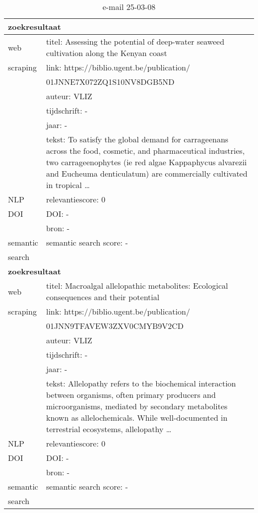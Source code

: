 \begin{table}[h!]
    \caption{e-mail 25-03-08}
    \centering
    \begin{tabularx}{\textwidth}{|p{4cm}|X|} 
        \hline
        \multicolumn{2}{|X|}{\textbf{zoekresultaat}} \\
        \hline
        web &titel:  Assessing the potential of deep-water seaweed cultivation along the Kenyan coast\\
        scraping&link: https://biblio.ugent.be/publication/\\&01JNNE7X072ZQ1S10NV8DGB5ND\\
        &auteur: VLIZ\\
        &tijdschrift: -\\
        &jaar: -\\
        &tekst: To satisfy the global demand for carrageenans across the food, cosmetic, and pharmaceutical industries, two carrageenophytes (ie red algae Kappaphycus alvarezii and Eucheuma denticulatum) are commercially cultivated in tropical …\\
        \hline
        NLP&relevantiescore: 0\\
        \hline
        DOI&DOI: -\\
        &bron: -\\
        \hline
        semantic&semantic search score: -\\
        search&\\
        \hline
        \multicolumn{2}{|X|}{\textbf{zoekresultaat}} \\
        \hline
        web &titel: Macroalgal allelopathic metabolites: Ecological consequences and their potential\\
        scraping&link: https://biblio.ugent.be/publication/\\&01JNN9TFAVEW3ZXV0CMYB9V2CD\\
        &auteur: VLIZ\\
        &tijdschrift: -\\
        &jaar: -\\
        &tekst: Allelopathy refers to the biochemical interaction between organisms, often primary producers and microorganisms, mediated by secondary metabolites known as allelochemicals. While well-documented in terrestrial ecosystems, allelopathy …\\
        \hline
        NLP&relevantiescore: 0\\
        \hline
        DOI&DOI: -\\
        &bron: -\\
        \hline
        semantic&semantic search score: -\\
        search&\\
        \hline
    \end{tabularx}
    \label{table:email20250308}
\end{table}
